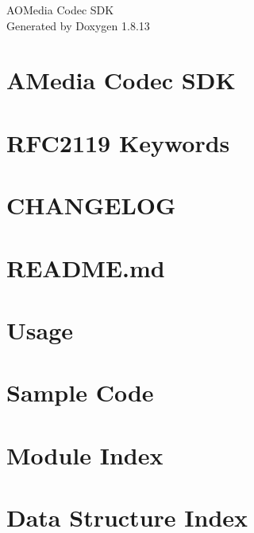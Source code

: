 \documentclass[twoside]{article}
\newcommand{\+}{\discretionary{\mbox{\scriptsize$\hookleftarrow$}}{}{}}
\begin{document}
\hypersetup{pageanchor=false,
             bookmarksnumbered=true,
             pdfencoding=unicode
            }
\begin{titlepage}
\vspace*{7cm}
\begin{center}%
{\Large A\+O\+Media Codec S\+DK }\\
\vspace*{1cm}
{\large Generated by Doxygen 1.8.13}\\
\end{center}
\end{titlepage}
\tableofcontents
{}
\hypersetup{pageanchor=true}

\section{A\+Media Codec S\+DK}
\label{index}\hypertarget{index}{}
\section{R\+F\+C2119 Keywords}
\label{rfc2119}

\section{C\+H\+A\+N\+G\+E\+L\+OG}
\label{changelog}

\section{R\+E\+A\+D\+M\+E.\+md}
\label{readme}

\section{Usage}
\label{usage}

\section{Sample Code}
\label{samples}

\section{Module Index}

\section{Data Structure Index}

\end{document}
